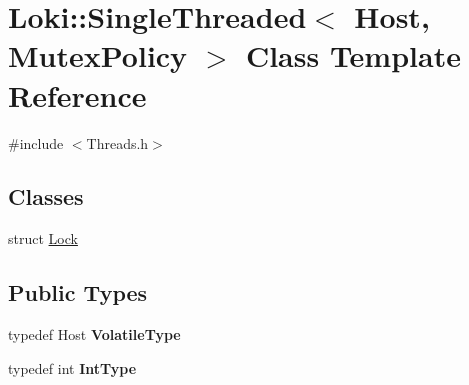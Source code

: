 \hypertarget{classLoki_1_1SingleThreaded}{}\section{Loki\+:\+:Single\+Threaded$<$ Host, Mutex\+Policy $>$ Class Template Reference}
\label{classLoki_1_1SingleThreaded}


{\ttfamily \#include $<$Threads.\+h$>$}

\subsection*{Classes}
\begin{DoxyCompactItemize}
\item 
struct \hyperlink{structLoki_1_1SingleThreaded_1_1Lock}{Lock}
\end{DoxyCompactItemize}
\subsection*{Public Types}
\begin{DoxyCompactItemize}
\item 
\hypertarget{classLoki_1_1SingleThreaded_a3fef4723aad84781feda8f50d6751796}{}typedef Host {\bfseries Volatile\+Type}\label{classLoki_1_1SingleThreaded_a3fef4723aad84781feda8f50d6751796}

\item 
\hypertarget{classLoki_1_1SingleThreaded_a277b17f61aa3c5a8f4ff4de9fea0132b}{}typedef int {\bfseries Int\+Type}\label{classLoki_1_1SingleThreaded_a277b17f61aa3c5a8f4ff4de9fea0132b}

\end{DoxyCompactItemize}
